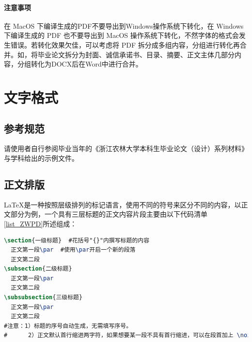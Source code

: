 \documentclass[AutoFakeBold]{ZafuThesis}
\begin{document}
\paragraph{注意事项}
在 MacOS 下编译生成的PDF不要导出到Windows操作系统下转化，在 Windows 下编译生成的 PDF 也不要导出到 MacOS 操作系统下转化，不然字体的格式会发生错误。若转化效果欠佳，可以考虑将 PDF 拆分成多组内容，分组进行转化再合并。如，将毕业论文拆分为封面、诚信承诺书、目录、摘要、正文主体几部分内容，分组转化为DOCX后在Word中进行合并。



\section{文字格式}
\subsection{参考规范}
请使用者自行参阅毕业当年的《浙江农林大学本科生毕业论文（设计）系列材料》与学科给出的示例文件。
\subsection{正文排版}
\LaTeX 是一种按照层级排列的标记语言，使用不同的符号来区分不同的内容，以正文部分为例，一个具有三层标题的正文内容片段主要由以下代码清单 \ref{list_ZWPD}所述组成：

\begin{lstlisting}[caption=正文片段, label = list_ZWPD,language = tex]
\section{一级标题}  #花括号"{}"内撰写标题的内容
  正文第一段\par  #使用\par开启一个新的段落
  正文第二段
\subsection{二级标题}
  正文第一段\par
  正文第二段
\subsubsection{三级标题}
  正文第一段\par
  正文第二段
#注意：1）标题的序号自动生成，无需填写序号。
#      2）正文默认首行缩进两字符，如果想要某一段不具有首行缩进，可以在段首加上 \noindent
\end{lstlisting}
\par
\end{document}
